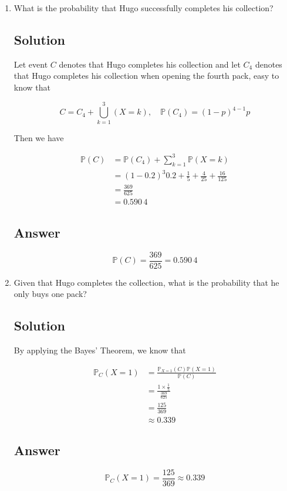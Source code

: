 \documentclass[12pt]{article}
\newcommand{\bP}{\mathbb{P}}
\begin{document}
\begin{enumerate}[start=1,label={\bfseries Part \arabic*:},leftmargin=0in]
		\bigskip\item What is the probability that Hugo successfully completes his collection?
		
		\subsection*{Solution}
		
			Let event $C$ denotes that Hugo completes his collection and let $C_4$ denotes that Hugo completes his collection when opening the fourth pack, easy to know that
			
			\[C = C_4 + \bigcup_{k=1}^3(X = k),\quad \bP(C_4) = (1-p)^{4-1}p\]
			
			Then we have
			
			\[
				\begin{aligned}
					\bP(C) &= \bP(C_4) + \sum_{k=1}^3\bP(X = k)\\
					&= (1-0.2)^{3}0.2 + \frac{1}{5} + \frac{4}{25} + \frac{16}{125}\\
					&= \frac{369}{625}\\
					&= 0.590\,4
				\end{aligned}
			\]
		
		\subsection*{Answer}
		
			\[\boxed{\bP(C) = \frac{369}{625} = 0.590\,4}\]
			
		\bigskip\item Given that Hugo completes the collection, what is the probability that he only buys one pack?
		
		\subsection*{Solution}
		
			By applying the Bayes’ Theorem, we know that
			
			\[
				\begin{aligned}
					\bP_C(X = 1) &= \frac{\bP_{X = 1}(C)\bP(X = 1)}{\bP(C)}\\
					&= \frac{1\times \frac{1}{5}}{\frac{369}{625}}\\
					&= \frac{125}{369}\\
					&\approx 0.339
				\end{aligned}
			\]
		
		\subsection*{Answer}
		
			\[\boxed{\bP_C(X = 1) = \frac{125}{369} \approx 0.339}\]
	\end{enumerate}
	
\end{document}
